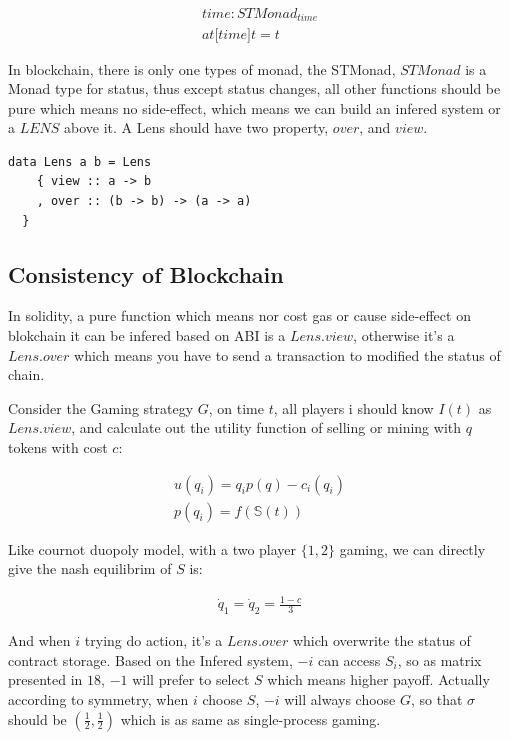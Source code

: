 \documentclass[twocolumn]{article}
\begin{document}
\begin{gather}
  time: STMonad_{time}\\
  at \mathbb{[} time \mathbb{]}t = t
\end{gather}

In blockchain, there is only one types of monad, the STMonad, $STMonad$ is a Monad type for status, thus except status changes, all other functions should be pure which means no side-effect, which means we can build an infered system or a $LENS$\cite {lens} above it. A Lens should have two property, $over$, and $view$. 

\lstset{language=Haskell}
\begin{lstlisting}
data Lens a b = Lens
    { view :: a -> b
    , over :: (b -> b) -> (a -> a)
  }
\end{lstlisting}

\subsection {Consistency of Blockchain}

In solidity, a pure function which means nor cost gas or cause side-effect on blokchain it can be infered based on ABI is a $Lens.view$, otherwise it's a $Lens.over$ which means you have to send a transaction to modified the status of chain.

Consider the Gaming strategy $G$, on time $t$, all players i should know $I(t)$ as $Lens.view$, and calculate out the utility function of selling or mining with $q$ tokens with cost $c$:

\begin{gather}
  u(q_i) = q_ip(q) - c_i(q_i)\\
  p(q_i) = f(\mathbb{S}(t))
\end{gather}

Like cournot duopoly model, with a two player $\{1, 2\}$ gaming, we can directly give the nash equilibrim of $S$ is:

\begin{gather}
  \dot{q}_1 = \dot{q}_2 = \frac{1-c}{3}
\end{gather}

And when $i$ trying do action, it's a $Lens.over$ which overwrite the status of contract storage. Based on the Infered system, $-i$ can access $S_i$, so as matrix presented in $18$, $-1$ will prefer to select $S$ which means higher payoff. Actually according to symmetry, when $i$ choose $S$, $-i$ will always choose $G$, so that $\sigma$ should be $(\frac{1}{2}, \frac{1}{2})$ which is as same as single-process gaming.
\end{document}
